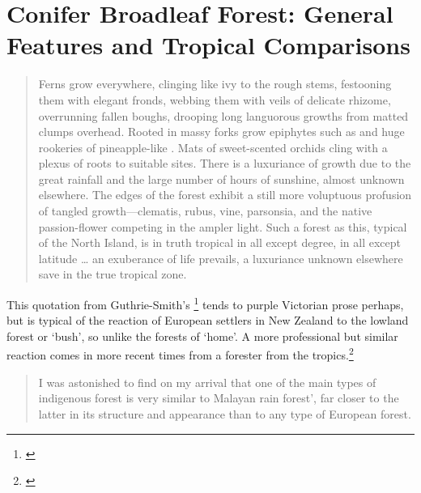 \chapter{Conifer Broadleaf Forest: General Features and Tropical Comparisons}

\begin{quote}
    Ferns grow everywhere, clinging like ivy to the rough stems, festooning them with elegant fronds, webbing them with veils of delicate rhizome, overrunning fallen boughs, drooping long languorous growths from matted clumps overhead.
Rooted in massy forks grow epiphytes such as  and huge rookeries of pineapple-like .
Mats of sweet-scented orchids cling with a plexus of roots to suitable sites.
There is a luxuriance of growth due to the great rainfall and the large number of hours of sunshine, almost unknown elsewhere.
The edges of the forest exhibit a still more voluptuous profusion of tangled growth—clematis, rubus, vine, parsonsia, and the native passion-flower competing in the ampler light.
Such a forest as this, typical of the North Island, is in truth tropical in all except degree, in all except latitude … an exuberance of life prevails, a luxuriance unknown elsewhere save in the true tropical zone.
\end{quote}

This quotation from  Guthrie-Smith's \footnote{\cite{guthriesmith1926tutira}} tends to purple Victorian prose perhaps, but is typical of the reaction of European settlers in New Zealand to the lowland forest or `bush', so unlike the forests of `home'.
A more professional but similar reaction comes in more recent times from a forester from the tropics.\footnote{\cite{brown1960forester}}

\begin{quote}
    I was astonished to find on my arrival that one of the main types of indigenous forest is very similar to Malayan rain forest', far closer to the latter in its structure and appearance than to any type of European forest.
\end{quote}

